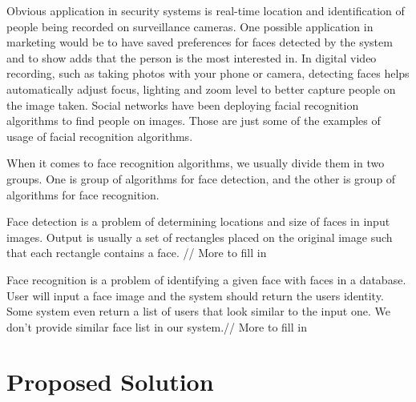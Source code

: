 \documentclass[11pt, draftclsnofoot, onecolumn]{IEEEtran}
\begin{document}
Obvious application in security systems is real-time location and identification of people being recorded on surveillance cameras. One possible application in marketing would be to have saved preferences for faces detected by the system and to show adds that the person is the most interested in. In digital video recording, such as taking photos with your phone or camera, detecting faces helps automatically adjust focus, lighting and zoom level to better capture people on the image taken. Social networks have been deploying facial recognition algorithms to find people on images. Those are just some of the examples of usage of facial recognition algorithms.

When it comes to face recognition algorithms, we usually divide them in two groups. One is group of algorithms for face detection, and the other is group of algorithms for face recognition.

Face detection is a problem of determining locations and size of faces in input images. Output is usually a set of rectangles placed on the original image such that each rectangle contains a face. // More to fill in

Face recognition is a problem of identifying a given face with faces in a database. User will input a face image and the system should return the users identity. Some system even return a list of users that look similar to the input one. We don't provide similar face list in our system.// More to fill in

\section{Proposed Solution} \label{sec:solution}
\end{document}
